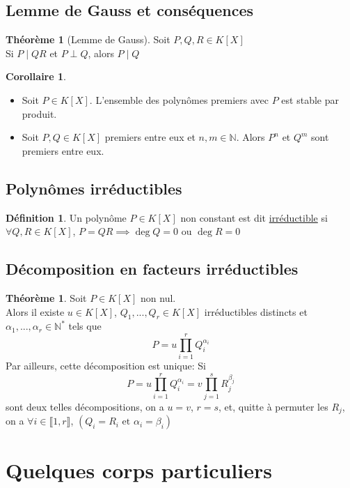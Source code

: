 \documentclass[10pt,a4paper]{article}
\theoremstyle{definition}
\newtheorem{theorem}[proposition]{Théorème}
\newtheorem{corollaire}[proposition]{Corollaire}
\newtheorem{definition}[proposition]{Définition}
\begin{document}
\subsection{Lemme de Gauss et conséquences}
\begin{theorem}[Lemme de Gauss]
Soit $P, Q, R \in K[X]$ \\
Si $P \mid QR$ et $P \perp Q$, alors $P \mid Q$
\end{theorem}
\begin{corollaire}
\hfill
\begin{itemize}
\item Soit $P \in K[X]$. L'ensemble des polynômes premiers avec $P$ est stable par produit.
\item Soit $P, Q \in K[X]$ premiers entre eux et $n, m \in \mathbb{N}$. Alors $P^n$ et $Q^m$ sont premiers entre eux.
\end{itemize}
\end{corollaire}

\subsection{Polynômes irréductibles}
\begin{definition}
Un polynôme $P \in K[X]$ non constant est dit \uline{irréductible} si \\
$\forall Q, R \in K[X]$, $P = QR \implies \deg{Q} = 0$ ou $\deg{R} = 0$
\end{definition}

\subsection{Décomposition en facteurs irréductibles}
\begin{theorem}
Soit $P \in K[X]$ non nul. \\
Alors il existe $u \in K[X]$, $Q_1, ... , Q_r \in K[X]$ irréductibles distincts et $\alpha_1, ... , \alpha_r \in \mathbb{N}^*$ tels que
\[P = u \prod\limits_{i = 1}^{r} Q_i^{\alpha_i}\]
Par ailleurs, cette décomposition est unique: Si
\[P = u \prod\limits_{i = 1}^{r} Q_i^{\alpha_i} = v \prod\limits_{j = 1}^{s} R_j^{\beta_j}\] sont deux telles décompositions, on a $u = v$, $r = s$, et, quitte à permuter les $R_j$, \\
on a $\forall i \in \llbracket 1, r \rrbracket$, $(Q_i = R_i \text{ et } \alpha_i = \beta_i)$
\end{theorem}

\section{Quelques corps particuliers}
\end{document}
